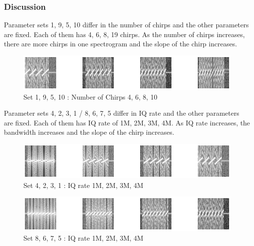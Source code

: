    \subsubsection*{Discussion}
    Parameter sets 1, 9, 5, 10 differ in the number of chirps and the other parameters are fixed. Each of them has 4, 6, 8, 19 chirps. As the number of chirps increases, there are more chirps in one spectrogram and the slope of the chirp increases. \\
    
    \vspace{-4mm}  
    \begin{figure}[!h]\raggedleft
    \hspace{15mm}
		\includegraphics[width=.95\textwidth]{image/week04/1-1-2.png}
		\caption{\footnotesize Set 1, 9, 5, 10 : Number of Chirps 4, 6, 8, 10}
		\vspace{-10pt}
    \end{figure}
    
    Parameter sets 4, 2, 3, 1 / 8, 6, 7, 5 differ in IQ rate and the other parameters are fixed. Each of them has IQ rate of 1M, 2M, 3M, 4M. As IQ rate increases, the bandwidth increases and the slope of the chirp increases. \\
    
    \vspace{-4mm}  
    \begin{figure}[!h]\raggedleft
    \hspace{15mm}
		\includegraphics[width=.95\textwidth]{image/week04/1-1-3.png}
		\caption{\footnotesize Set 4, 2, 3, 1 : IQ rate 1M, 2M, 3M, 4M}
		\vspace{-10pt}
    \end{figure}
    
    \vspace{-4mm}  
    \begin{figure}[!h]\raggedleft
    \hspace{15mm}
		\includegraphics[width=.95\textwidth]{image/week04/1-1-4.png}
		\caption{\footnotesize Set 8, 6, 7, 5 : IQ rate 1M, 2M, 3M, 4M}
		\vspace{-10pt}
    \end{figure}
    
    

